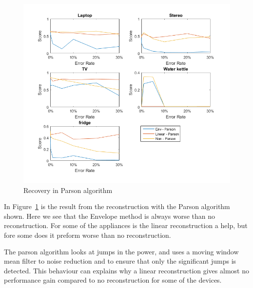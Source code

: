 \newpage

\begin{figure}[H]
\centering
\includegraphics[width=1\textwidth]{billeder/Rec-Parson.png}
\caption{Recovery in Parson algorithm}
\label{fig:ERPARSON}
\end{figure}

In Figure~\ref{fig:ERPARSON} is the result from the reconstruction with the Parson algorithm shown. Here we see that the Envelope method is always worse than no reconstruction. For some of the appliances is the linear reconstruction a help, but fore some does it preform worse than no reconstruction. 

The parson algorithm looks at jumps in the power, and uses a moving window mean filter to noise reduction and to ensure that only the significant jumps is detected. This behaviour can explains why a linear reconstruction gives almost no performance gain compared to no reconstruction for some of the devices.
 
